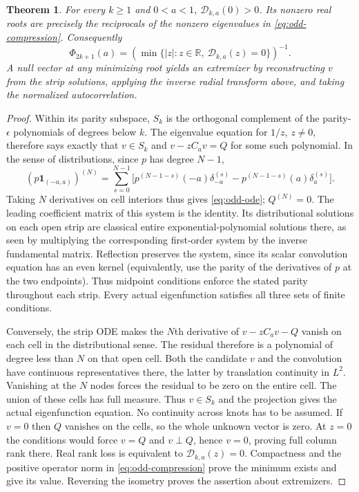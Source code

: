 \documentclass[11pt,a4paper]{article}
\newtheorem{theorem}{Theorem}[section]\newtheorem{lemma}[theorem]{Lemma}\newtheorem{proposition}[theorem]{Proposition}\newtheorem{corollary}[theorem]{Corollary}
\numberwithin{equation}{section}
\begin{document}
\begin{theorem}\label{thm:odd-finite}
For every $k\ge1$ and $0<a<1$, $\mathcal D_{k,a}(0)>0$. Its nonzero real roots are precisely the reciprocals of the nonzero eigenvalues in \eqref{eq:odd-compression}. Consequently
\[
 \Phi_{2k+1}(a)=\left(\min\{|z|:z\in\mathbb R,\ \mathcal D_{k,a}(z)=0\}\right)^{-1}.
\]
A null vector at any minimizing root yields an extremizer by reconstructing $v$ from the strip solutions, applying the inverse radial transform above, and taking the normalized autocorrelation.
\end{theorem}
\begin{proof}
Within its parity subspace, $S_k$ is the orthogonal complement of the parity-$\epsilon$ polynomials of degrees below $k$. The eigenvalue equation for $1/z$, $z\ne0$, therefore says exactly that $v\in S_k$ and $v-zC_av=Q$ for some such polynomial. In the sense of distributions, since $p$ has degree $N-1$,
\[
 (p\mathbf1_{(-a,a)})^{(N)}
 =\sum_{s=0}^{N-1}\bigl[p^{(N-1-s)}(-a)\delta_{-a}^{(s)}
                    -p^{(N-1-s)}(a)\delta_{a}^{(s)}\bigr].
\]
Taking $N$ derivatives on cell interiors thus gives \eqref{eq:odd-ode}; $Q^{(N)}=0$. The leading coefficient matrix of this system is the identity. Its distributional solutions on each open strip are classical entire exponential-polynomial solutions there, as seen by multiplying the corresponding first-order system by the inverse fundamental matrix. Reflection preserves the system, since its scalar convolution equation has an even kernel (equivalently, use the parity of the derivatives of $p$ at the two endpoints). Thus midpoint conditions enforce the stated parity throughout each strip. Every actual eigenfunction satisfies all three sets of finite conditions.

Conversely, the strip ODE makes the $N$th derivative of $v-zC_av-Q$ vanish on each cell in the distributional sense. The residual therefore is a polynomial of degree less than $N$ on that open cell. Both the candidate $v$ and the convolution have continuous representatives there, the latter by translation continuity in $L^2$. Vanishing at the $N$ nodes forces the residual to be zero on the entire cell. The union of these cells has full measure. Thus $v\in S_k$ and the projection gives the actual eigenfunction equation. No continuity across knots has to be assumed. If $v=0$ then $Q$ vanishes on the cells, so the whole unknown vector is zero. At $z=0$ the conditions would force $v=Q$ and $v\perp Q$, hence $v=0$, proving full column rank there. Real rank loss is equivalent to $\mathcal D_{k,a}(z)=0$. Compactness and the positive operator norm in \eqref{eq:odd-compression} prove the minimum exists and give its value. Reversing the isometry proves the assertion about extremizers.
\end{proof}
\end{document}
